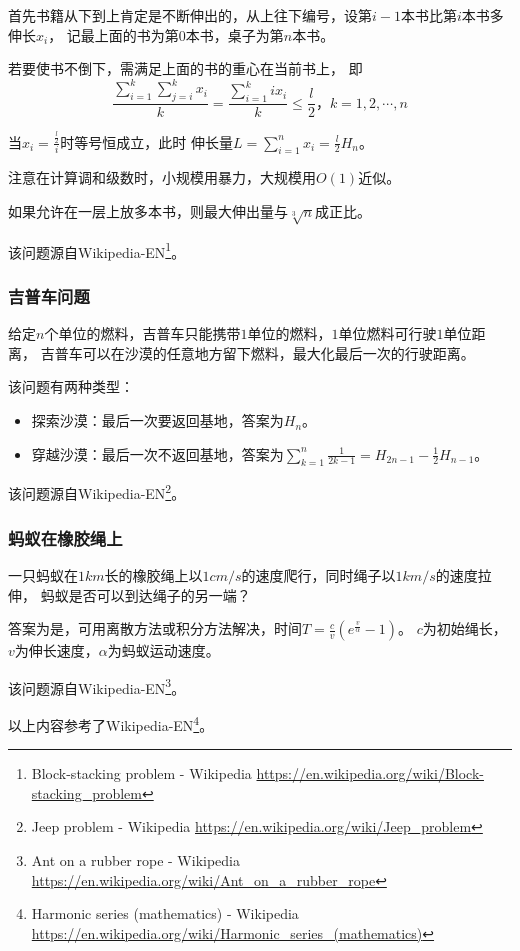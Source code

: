 首先书籍从下到上肯定是不断伸出的，从上往下编号，设第$i-1$本书比第$i$本书多伸长$x_i$，
记最上面的书为第$0$本书，桌子为第$n$本书。

若要使书不倒下，需满足上面的书的重心在当前书上，
即
\begin{displaymath}
	\frac{\sum_{i=1}^k{\sum_{j=i}^k{x_i}}}{k}=\frac{\sum_{i=1}^k{ix_i}}{k}\leq \frac{l}{2}，k=1,2,\cdots,n
\end{displaymath}

当$x_i=\frac{\frac{l}{2}}{i}$时等号恒成立，此时
伸长量$\displaystyle L=\sum_{i=1}^n{x_i}=\frac{l}{2}H_n$。

注意在计算调和级数时，小规模用暴力，大规模用$O(1)$近似。

如果允许在一层上放多本书，则最大伸出量与$\sqrt[3]{n}$成正比。

该问题源自Wikipedia-EN\footnote{Block-stacking problem - Wikipedia
	\url{https://en.wikipedia.org/wiki/Block-stacking\_problem}}。
\subsubsection{吉普车问题}

给定$n$个单位的燃料，吉普车只能携带$1$单位的燃料，$1$单位燃料可行驶$1$单位距离，
吉普车可以在沙漠的任意地方留下燃料，最大化最后一次的行驶距离。

该问题有两种类型：
\begin{itemize}
    \item 探索沙漠：最后一次要返回基地，答案为$H_n$。
    \item 穿越沙漠：最后一次不返回基地，答案为$\displaystyle
    \sum_{k=1}^n{\frac{1}{2k-1}}=H_{2n-1}-\frac{1}{2}H_{n-1}$。
\end{itemize}

该问题源自Wikipedia-EN\footnote{Jeep problem - Wikipedia
	\url{https://en.wikipedia.org/wiki/Jeep\_problem}}。
\subsubsection{蚂蚁在橡胶绳上}

一只蚂蚁在$1km$长的橡胶绳上以$1cm/s$的速度爬行，同时绳子以$1km/s$的速度拉伸，
蚂蚁是否可以到达绳子的另一端？

答案为是，可用离散方法或积分方法解决，时间$T=\frac{c}{v}(e^{\frac{v}{\alpha}}-1)$。
$c$为初始绳长，$v$为伸长速度，$\alpha$为蚂蚁运动速度。

该问题源自Wikipedia-EN\footnote{Ant on a rubber rope - Wikipedia
	\url{https://en.wikipedia.org/wiki/Ant\_on\_a\_rubber\_rope}}。

以上内容参考了Wikipedia-EN\footnote{Harmonic series (mathematics) - Wikipedia
	\url{https://en.wikipedia.org/wiki/Harmonic\_series\_(mathematics)}}。
